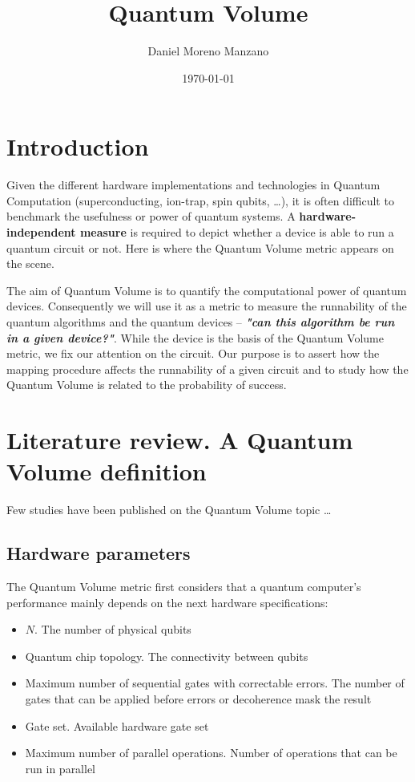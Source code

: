 \documentclass[11pt]{article}
\author{Daniel Moreno Manzano}
\date{\today}
\title{Quantum Volume}
\begin{document}
\maketitle


\section{Introduction}
\label{sec:org7706484}

Given the different hardware implementations and technologies in Quantum Computation (superconducting, ion-trap, spin qubits, \ldots{}), it is often difficult to benchmark the usefulness or power of quantum systems. 
A \textbf{hardware-independent measure} is required to depict whether a device is able to run a quantum circuit or not.
Here is where the Quantum Volume metric appears on the scene.

The aim of Quantum Volume is to quantify the computational power of quantum devices. 
Consequently we will use it as a metric to measure the runnability of the quantum algorithms and the quantum devices -- \emph{\textbf{"can this algorithm be run in a given device?"}}.
While the device is the basis of the Quantum Volume metric, we fix our attention on the circuit.
Our purpose is to assert how the mapping procedure affects the runnability of a given circuit and to study how the Quantum Volume is related to the probability of success.

\section{Literature review. A Quantum Volume definition}
\label{sec:orge3726c1}

Few studies have been published on the Quantum Volume topic \cite{Bishop_2017,Moll_2018}\ldots{}

\subsection{Hardware parameters}
\label{sec:orgc9a634a}

The Quantum Volume metric first considers that a quantum computer's performance mainly depends on the next hardware specifications:

\begin{itemize}
\item \(N\). The number of physical qubits
\item Quantum chip topology. The connectivity between qubits
\item Maximum number of sequential gates with correctable errors. The number of gates that can be applied before errors or decoherence mask the result
\item Gate set. Available hardware gate set
\item Maximum number of parallel operations. Number of operations that can be run in parallel
\end{itemize}
\end{document}

